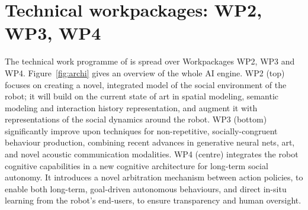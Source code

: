 % 
% 
% 
% 
% 
% 
% 
% 
% 



\section{Technical workpackages: WP2, WP3, WP4}

The technical work programme of \project is spread over Workpackages WP2, WP3
and WP4. Figure~\ref{fig:archi} gives an overview of the whole AI engine. WP2
(top) focuses on creating a novel, integrated model of the social environment of
the robot; it will build on the current state of art in spatial modeling,
semantic modeling and interaction history representation, and augment it with
representations of the social dynamics around the robot. WP3 (bottom)
significantly improve upon techniques for non-repetitive, socially-congruent
behaviour production, combining recent advances in generative neural nets, art,
and novel acoustic communication modalities. WP4 (centre) integrates the robot
cognitive capabilities in a new cognitive architecture for long-term social
autonomy. It introduces a novel arbitration mechanism between action policies,
to enable both long-term, goal-driven autonomous behaviours, and direct in-situ
learning from the robot's end-users, to ensure transparency and human oversight.

